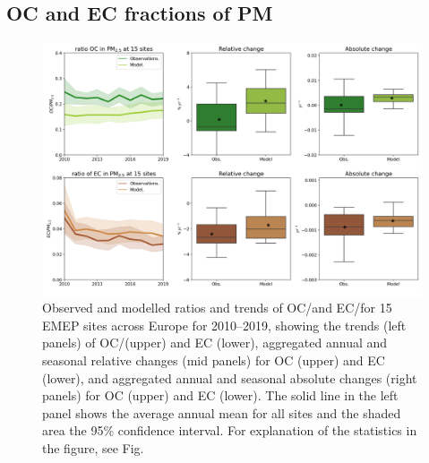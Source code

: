 



\subsection{OC and EC fractions of PM}
\label{ss:OCECfrac}


\begin{figure}
\includegraphics[width=16cm]{FIGS_TRENDS/ECOC_ratio_trends.png}
 \caption{Observed and modelled ratios and trends of OC/\pmfine and EC/\pmfine for
  15 EMEP sites across Europe for 2010--2019, showing the trends
  (left panels) of OC/\pmfine (upper) and EC (lower), aggregated annual and
  seasonal relative changes (mid panels) for OC (upper) and EC (lower),
  and aggregated annual and seasonal absolute changes (right panels)
  for OC (upper) and EC (lower). The solid line in the left panel shows
  the average annual mean for all sites and the shaded area the 95\%
  confidence interval. For explanation of the statistics in the figure,
  see Fig.~\label{fig:KEX3}
 }
\end{figure}

